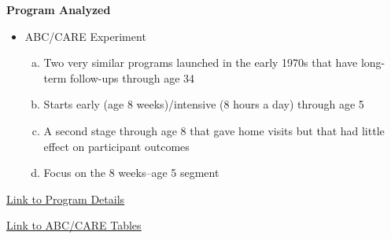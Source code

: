 \documentclass[static]{JJH-Beamer}
\begin{document}
\begin{frame}

\begin{block}{}
\begin{center}
\textbf{Program Analyzed}
\end{center}
\end{block}

\end{frame}

\begin{frame}

\begin{itemize}
\item ABC/CARE Experiment
    \begin{enumerate}[(a)]
    \item Two very similar programs launched in the early 1970s that have long-term follow-ups through age 34
    \item Starts early (age 8 weeks)/intensive (8 hours a day) through age 5
    \item A second stage through age 8 that gave home visits but that had little effect on participant outcomes
    \item Focus on the 8 weeks--age 5 segment
    \end{enumerate}
\end{itemize}

 \end{frame}

\begin{frame}

\hypertarget{ret:scrambledeggs}{}
\begin{center}
\hyperlink{scrambledeggs}{\underline{Link to Program Details}}
\end{center}

\end{frame}

\begin{frame}

\hypertarget{ret:pancakeswaffles}{}
\begin{center}
\hyperlink{pancakeswaffles}{\underline{Link to ABC/CARE Tables}}
\end{center}

\end{frame}
\end{document}
